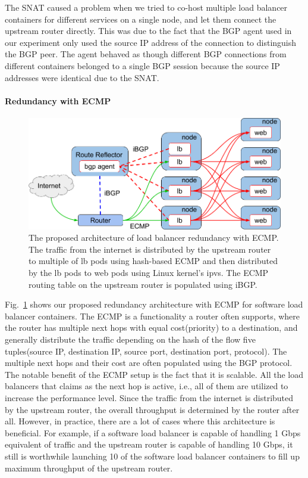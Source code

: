 The SNAT caused a problem when we tried to co-host multiple load balancer containers for different services on a single node, and let them connect the upstream router directly.
This was due to the fact that the BGP agent used in our experiment only used the source IP address of the connection to distinguish the BGP peer.
The agent behaved as though different BGP connections from different containers belonged to a single BGP session because the source IP addresses were identical due to the SNAT.


\paragraph{\bf Redundancy with ECMP}\label{Redundancy with ECMP}

\begin{figure}[tb]
\begin{center}
\includegraphics[width=\columnwidth]{Figs/ecmp.png}
\end{center}
\caption{
  The proposed architecture of load balancer redundancy with ECMP. \\ %
  The traffic from the internet is distributed by the upstream router to multiple of lb pods using hash-based ECMP and then distributed by the lb pods to web pods using Linux kernel's ipvs.
  The ECMP routing table on the upstream router is populated using iBGP.
}
\label{fig:ecmp}
\end{figure}

Fig.~\ref{fig:ecmp} shows our proposed redundancy architecture with ECMP for software load balancer containers.
%
The ECMP is a functionality a router often supports, where the router has multiple next hops with equal cost(priority) to a destination, and generally distribute the traffic depending on the hash of the flow five tuples(source IP, destination IP, source port, destination port, protocol).
The multiple next hops and their cost are often populated using the BGP protocol.
%
The notable benefit of the ECMP setup is the fact that it is scalable.
All the load balancers that claims as the next hop is active, i.e., all of them are utilized to increase the performance level.
Since the traffic from the internet is distributed by the upstream router, the overall throughput is determined by the router after all.
However, in practice, there are a lot of cases where this architecture is beneficial.
For example, if a software load balancer is capable of handling 1 Gbps equivalent of traffic and the upstream router is capable of handling 10 Gbps, it still is worthwhile launching 10 of the software load balancer containers to fill up maximum throughput of the upstream router.

